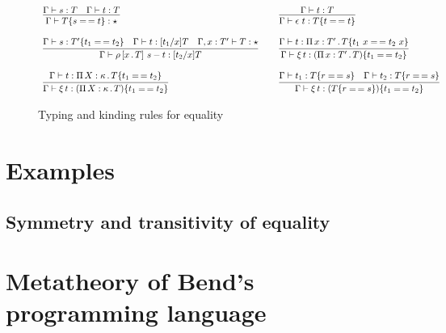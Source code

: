 \documentclass{article}
\begin{document}
\begin{figure}
  \[
  \begin{array}{lll}
    \infer{\Gamma\vdash\eqtm{s}{T}{t} : \star}{\Gamma\vdash s : T & \Gamma\vdash t : T}
    &\ &
\infer{\Gamma\vdash\rfl{t} : \eqtm{t}{T}{t}}{\Gamma\vdash t : T}
\\\\    
\infer{\Gamma\vdash\cng{x}{T}{s}{t} : [t_2/x]T}
          {\Gamma\vdash s : \eqtm{t_1}{T'}{t_2} & \Gamma \vdash t : [t_1/x]T & \Gamma,x:T'\vdash T : \star}
    &\ &
    \infer{\Gamma\vdash\ext{t} : \eqtm{t_1}{(\Pia{x}{T'}{T})}{t_2}}{\Gamma \vdash t : \Pia{x}{T'}{\eqtm{t_1\ x}{T}{t_2\ x}}}
\\ \\
\infer{\Gamma\vdash\ext{t} : \eqtm{t_1}{(\Pia{X}{\kappa}{T})}{t_2}}{\Gamma \vdash t : \Pia{X}{\kappa}{\eqtm{t_1}{T}{t_2}}}
&\ &
\infer{\Gamma\vdash\ext{t} : \eqtm{t_1}{(\eqtm{r}{T}{s})}{t_2}}{\Gamma\vdash t_1 : \eqtm{r}{T}{s} & \Gamma\vdash t_2 : \eqtm{r}{T}{s}}
    \end{array}
  \]
\caption{Typing and kinding rules for equality}
\label{fig:eqtp}
  \end{figure}
  
\section{Examples}



\subsection{Symmetry and transitivity of equality}



\section{Metatheory of Bend's programming language}
\label{sec:opmeta}



\end{document}
